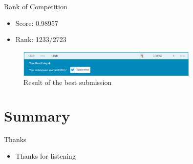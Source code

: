 \documentclass[
 size=12pt,
 paper=smartboard, %
 mode=present, %
 display=slides, %
style=tuliplab,
pauseslide,
fleqn,leqno]{powerdot}
\begin{document}
\begin{slide}{Rank of Competition}
  \begin{itemize}
    \item Score: 0.98957
    \item Rank: 1233/2723
  \end{itemize}
  \begin{figure}[h]
    \centering
    \includegraphics[width=0.8\textwidth]{figures/competition.eps}
    \caption{Result of the best submission}
    \label{fig:result-of-best-submission}
  \end{figure} 
\end{slide}


\section{Summary}

\begin{slide}{Thanks}
  \begin{itemize}
    \item Thanks for listening~
  \end{itemize}
\end{slide}

% 

% 
% 
\end{document}
